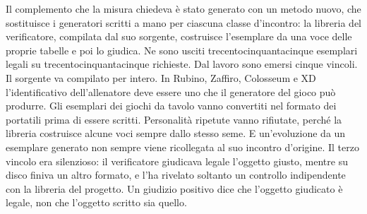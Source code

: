 Il complemento che la misura chiedeva è stato generato con un metodo nuovo, che sostituisce i generatori scritti a mano per ciascuna classe d'incontro: la libreria del verificatore, compilata dal suo sorgente, costruisce l'esemplare da una voce delle proprie tabelle e poi lo giudica. Ne sono usciti trecentocinquantacinque esemplari legali su trecentocinquantacinque richieste. Dal lavoro sono emersi cinque vincoli. Il sorgente va compilato per intero. In Rubino, Zaffiro, Colosseum e XD l'identificativo dell'allenatore deve essere uno che il generatore del gioco può produrre. Gli esemplari dei giochi da tavolo vanno convertiti nel formato dei portatili prima di essere scritti. Personalità ripetute vanno rifiutate, perché la libreria costruisce alcune voci sempre dallo stesso seme. E un'evoluzione da un esemplare generato non sempre viene ricollegata al suo incontro d'origine. Il terzo vincolo era silenzioso: il verificatore giudicava legale l'oggetto giusto, mentre su disco finiva un altro formato, e l'ha rivelato soltanto un controllo indipendente con la libreria del progetto. Un giudizio positivo dice che l'oggetto giudicato è legale, non che l'oggetto scritto sia quello.

